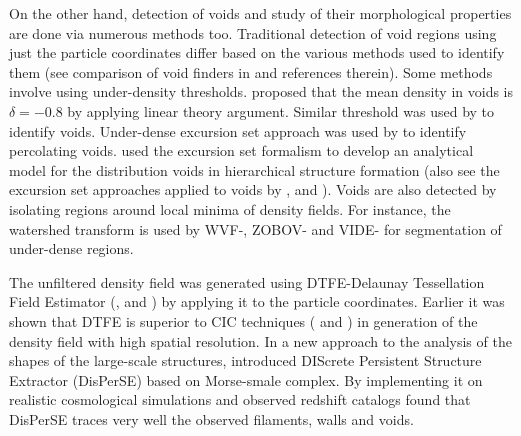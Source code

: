 On the other hand, detection of voids and study of their morphological properties are done via numerous methods too. Traditional detection of void regions using just the particle coordinates differ based on the various methods used to identify them (see comparison of void finders in \citealt{Colberg2008} and references therein). Some methods involve using under-density thresholds. \cite{Blumenthal1992} proposed that the mean density in voids is $\delta = -0.8$ by applying linear theory argument. Similar threshold was used by \cite{Colberg2005} to identify voids. Under-dense excursion set approach was used by \cite{Shandarin2006} to identify percolating voids. \cite{Sheth2003b} used the excursion set formalism to develop an analytical model for the distribution voids in hierarchical structure formation (also see the excursion set approaches applied to voids by \citealt{Paranjape2012}, \citealt{Jennings2013} and \citealt{Achitouv2015}). Voids are also detected by isolating regions around local minima of density fields. For instance, the watershed transform is used by WVF-\cite{Platen2007},  ZOBOV-\cite{Neyrinck2008} and VIDE-\cite{Sutter2015} for segmentation of under-dense regions. 


The unfiltered density field was generated using DTFE-Delaunay Tessellation Field Estimator (\citealt{Schaap2000}, \citealt{Weygaert2009a} and \citealt{Cautun2011b}) by applying it to the particle coordinates. Earlier it was shown that DTFE is superior to CIC techniques (\citealt{Schaap2007} and \citealt{Weygaert2009a}) in generation of the density field with high spatial resolution. In a new approach to the analysis of the shapes of the large-scale structures, \cite{Sousbie2011f} introduced DIScrete Persistent Structure Extractor ({DisPerSE}) based on Morse-smale complex. By implementing it on realistic cosmological simulations and observed redshift catalogs \cite{Sousbie2011e} found that DisPerSE traces very well the observed filaments, walls and voids.

